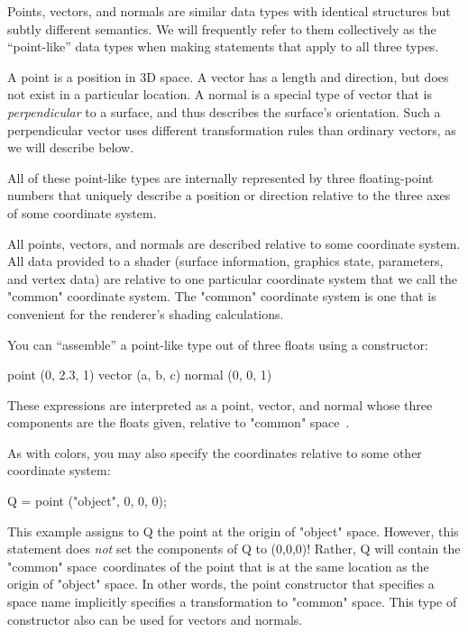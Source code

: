 \documentclass[11pt,letterpaper]{book}
\def\normal{{\cf normal}\xspace}
\def\point{{\cf point}\xspace}
\def\vector{{\cf vector}\xspace}
\def\commonspace{{\cf "common"} space\xspace}
\def\objectspace{{\cf "object"} space\xspace}
\begin{document}
Points, vectors, and normals are similar data types with identical
structures but subtly different semantics.  We will frequently refer to
them collectively as the ``point-like'' data types when making
statements that apply to all three types.

A \point is a position in 3D space.  A \vector has a length and
direction, but does not exist in a particular location.  A \normal is a
special type of vector that is \emph{perpendicular} to a surface, and
thus describes the surface's orientation.  Such a perpendicular vector
uses different transformation rules than ordinary vectors, as we will
describe below.

All of these point-like types are internally represented by three
floating-point numbers that uniquely describe a position or
direction relative to the three axes of some coordinate system.  

All points, vectors, and normals are described relative to some
coordinate system.  All data provided to a shader (surface information,
graphics state, parameters, and vertex data) are relative to one
particular coordinate system that we call the {\cf "common"} coordinate
system.  The {\cf "common"} coordinate system is one that is convenient
for the renderer's shading calculations.
\label{sect:commonspace}

You can ``assemble'' a point-like type out of three floats using a
constructor:

\begin{code}
        point (0, 2.3, 1)
        vector (a, b, c)
        normal (0, 0, 1)
\end{code}

\noindent These expressions are interpreted as a point, vector, and normal
whose three components are the floats given, relative to \commonspace\ .

As with colors, you may also specify the coordinates relative to some other
coordinate system:

\begin{code}
    Q = point ("object", 0, 0, 0);
\end{code}

This example assigns to {\cf Q} the point at the origin of
\objectspace.  However, this statement does \emph{not} set the
components of {\cf Q} to (0,0,0)!  Rather, {\cf Q} will contain the
\commonspace\ coordinates of the point that is at the same location as
the origin of \objectspace.  In other words, the point constructor that
specifies a space name implicitly specifies a transformation
to \commonspace.  This type of constructor also can be used for vectors
and normals.
\end{document}
